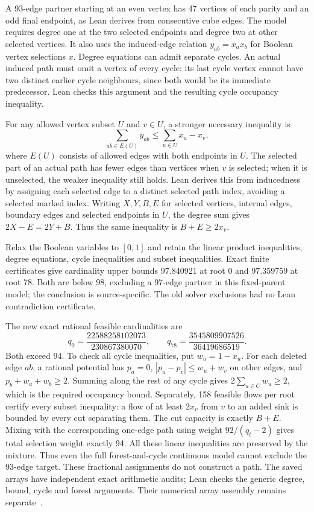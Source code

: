 \documentclass[11pt,a4paper]{article}
\begin{document}
A 93-edge partner starting at an even vertex has 47 vertices of each parity
and an odd final endpoint, as Lean derives from consecutive cube edges.
The model requires degree one at the two selected endpoints and degree two
at other selected vertices. It also uses the induced-edge relation
$y_{ab}=x_ax_b$ for Boolean vertex selections $x$.
Degree equations can admit separate cycles. An actual induced path must omit
a vertex of every cycle: its last cycle vertex cannot have two distinct
earlier cycle neighbours, since both would be its immediate predecessor.
Lean checks this argument and the resulting cycle occupancy inequality.

For any allowed vertex subset $U$ and $v\in U$, a stronger necessary inequality is
\[
\sum_{ab\in E(U)}y_{ab}\le\sum_{u\in U}x_u-x_v,
\]
where $E(U)$ consists of allowed edges with both endpoints in $U$.
The selected part of an actual path has fewer edges than vertices when
$v$ is selected; when it is unselected, the weaker inequality still holds.
Lean derives this from inducedness by assigning each selected edge to a
distinct selected path index, avoiding a selected marked index.
Writing $X,Y,B,E$ for selected vertices, internal edges, boundary edges
and selected endpoints in $U$, the degree sum gives
$2X-E=2Y+B$. Thus the same inequality is $B+E\ge2x_v$.

Relax the Boolean variables to $[0,1]$ and retain the linear product
inequalities, degree equations, cycle inequalities and subset inequalities.
Exact finite certificates give cardinality upper bounds 97.840921 at
root 0 and 97.359759 at root 78. Both are below 98, excluding a 97-edge
partner in this fixed-parent model; the conclusion is source-specific.
The old solver exclusions had no Lean contradiction certificate.

The new exact rational feasible cardinalities are
\[
q_0=\frac{22588258102073}{230867380070},\qquad
q_{78}=\frac{3545809907526}{36419686519}.
\]
Both exceed 94. To check all cycle inequalities, put $w_u=1-x_u$.
For each deleted edge $ab$, a rational potential has $p_a=0$,
$|p_u-p_v|\le w_u+w_v$ on other edges, and $p_b+w_a+w_b\ge2$.
Summing along the rest of any cycle gives $2\sum_{u\in C}w_u\ge2$,
which is the required occupancy bound. Separately, 158 feasible flows
per root certify every subset inequality: a flow of at least $2x_v$
from $v$ to an added sink is bounded by every cut separating them.
The cut capacity is exactly $B+E$. Mixing with the corresponding one-edge path
using weight $92/(q_t-2)$ gives total selection weight exactly 94.
All these linear inequalities are preserved by the mixture.
Thus even the full forest-and-cycle continuous model cannot exclude the
93-edge target. These fractional assignments do not construct a path.
The saved arrays have independent exact arithmetic audits; Lean checks the
generic degree, bound, cycle and forest arguments. Their numerical array
assembly remains separate~\cite{research220}.
\end{document}
